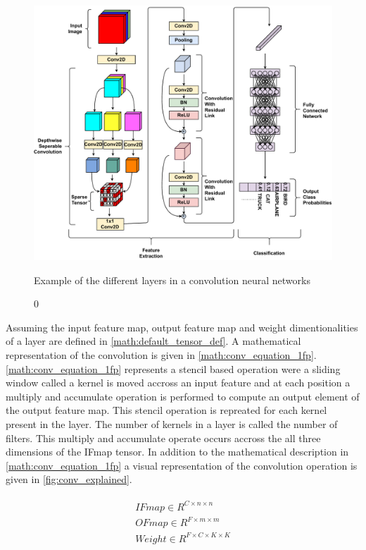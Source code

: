 \begin{figure}[ht]
    \centering
    \includegraphics[scale=0.4]{fig/cnn.pdf}
    \caption0{Example of the different layers in a convolution neural networks}
    \label{fig:cnn_network}
\end{figure}


Assuming the input feature map, output feature map and weight dimentionalities
of a layer are defined in \autoref{math:default_tensor_def}. A mathematical
representation of the convolution is given in \autoref{math:conv_equation_1fp}.
\autoref{math:conv_equation_1fp} represents a stencil based operation were a
sliding window called a kernel is moved accross an input feature and at each
position a multiply and accumulate operation is performed to compute an output
element of the output feature map. This stencil operation is repreated for each
kernel present in the layer. The number of kernels in a layer is called the
number of filters. This multiply and accumulate operate occurs accross the all
three dimensions of the IFmap tensor. In addition to the mathematical
description in \autoref{math:conv_equation_1fp} a visual representation of the
convolution operation is given in \autoref{fig:conv_explained}.

\begin{align}
    \begin{split}
        IFmap \in R^{C \times n\times n} \\
        OFmap \in  R^{F \times m\times m} \\
        Weight \in R^{F \times C\times K\times K} \\
    \end{split}
    \label{math:default_tensor_def}
\end{align}

